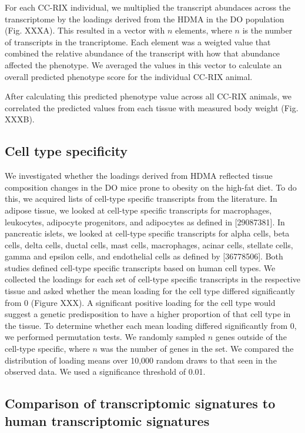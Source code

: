 \documentclass[
]{article}
\begin{document}
For each CC-RIX individual, we multiplied the transcript abundaces
across the transcriptome by the loadings derived from the HDMA in the DO
population (Fig. XXXA). This resulted in a vector with \(n\) elements,
where \(n\) is the number of transcripts in the trancriptome. Each
element was a weigted value that combined the relative abundance of the
transcript with how that abundance affected the phenotype. We averaged
the values in this vector to calculate an overall predicted phenotype
score for the individual CC-RIX animal.

After calculating this predicted phenotype value across all CC-RIX
animals, we correlated the predicted values from each tissue with
measured body weight (Fig. XXXB).

\subsection{Cell type specificity}\label{cell-type-specificity}

We investigated whether the loadings derived from HDMA reflected tissue
composition changes in the DO mice prone to obesity on the high-fat
diet. To do this, we acquired lists of cell-type specific transcripts
from the literature. In adipose tissue, we looked at cell-type specific
transcripts for macrophages, leukocytes, adipocyte progenitors, and
adipocytes as defined in {[}29087381{]}. In pancreatic islets, we looked
at cell-type specific transcripts for alpha cells, beta cells, delta
cells, ductal cells, mast cells, macrophages, acinar cells, stellate
cells, gamma and epsilon cells, and endothelial cells as defined by
{[}36778506{]}. Both studies defined cell-type specific transcripts
based on human cell types. We collected the loadings for each set of
cell-type specific transcripts in the respective tissue and asked
whether the mean loading for the cell type differed significantly from 0
(Figure XXX). A significant positive loading for the cell type would
suggest a genetic predisposition to have a higher proportion of that
cell type in the tissue. To determine whether each mean loading differed
significantly from 0, we performed permutation tests. We randomly
sampled \(n\) genes outside of the cell-type specific, where \(n\) was
the number of genes in the set. We compared the distribution of loading
means over 10,000 random draws to that seen in the observed data. We
used a significance threshold of 0.01.

\subsection{Comparison of transcriptomic signatures to human
transcriptomic
signatures}\label{comparison-of-transcriptomic-signatures-to-human-transcriptomic-signatures}
\end{document}

